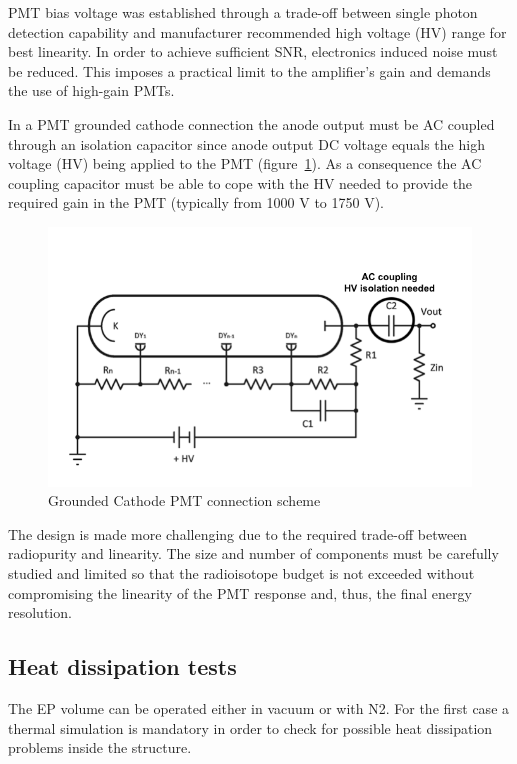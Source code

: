 \documentclass[a4paper, 10pt, oneside, twocolumn, 3p]{elsarticle}
\begin{document}
\par PMT bias voltage was established through a trade-off between single photon detection capability and manufacturer recommended high voltage (HV) range for best linearity. In order to achieve sufficient SNR, electronics induced noise must be reduced. This imposes a practical limit to the amplifier's gain and demands the use of \mbox{high-gain} PMTs.


\par In a PMT grounded cathode connection the anode output must be AC coupled through an isolation capacitor since anode output DC voltage equals the high voltage (HV) being applied to the PMT (figure~\ref{fig:grounded_cathode}). As a consequence the AC coupling capacitor must be able to cope with the HV needed to provide the required gain in the PMT (typically from 1000 V to 1750 V). 

\begin{figure} [H]
	\begin{center}
		\includegraphics[width=.4\textwidth]{./figures/AC_diagram.png}
		\caption{Grounded Cathode PMT connection scheme}
		\label{fig:grounded_cathode}
	\end{center}
\end{figure}


\par The design is made more challenging due to the required trade-off between radiopurity and linearity. The size and number of components must be carefully studied and limited so that the radioisotope budget is not exceeded without compromising the linearity of the PMT response and, thus, the final energy resolution.



\subsection {Heat dissipation tests}

\par The EP volume can be operated either in vacuum or with N2. For the first case a thermal simulation is mandatory in order to check for possible heat dissipation problems inside the structure.
\end{document}
